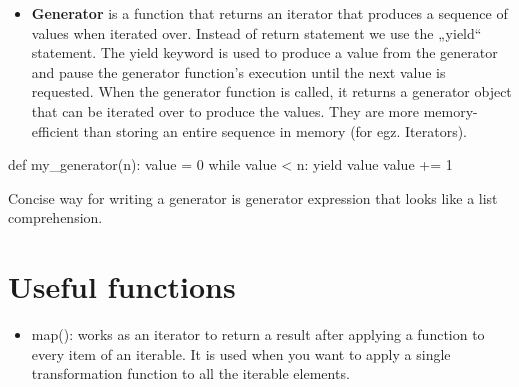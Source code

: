 \documentclass[
  letterpaper,
  DIV=11,
  numbers=noendperiod]{scrreprt}
\newenvironment{Shaded}{\begin{snugshade}}{\end{snugshade}}
\newcommand{\ControlFlowTok}[1]{\textcolor[rgb]{0.00,0.23,0.31}{#1}}
\newcommand{\DecValTok}[1]{\textcolor[rgb]{0.68,0.00,0.00}{#1}}
\newcommand{\KeywordTok}[1]{\textcolor[rgb]{0.00,0.23,0.31}{#1}}
\newcommand{\NormalTok}[1]{\textcolor[rgb]{0.00,0.23,0.31}{#1}}
\newcommand{\OperatorTok}[1]{\textcolor[rgb]{0.37,0.37,0.37}{#1}}
\providecommand{\tightlist}{%
  \setlength{\itemsep}{0pt}\setlength{\parskip}{0pt}}\usepackage{longtable,booktabs,array}
\begin{document}
\begin{itemize}
\tightlist
\item
  \textbf{Generator} is a function that returns an iterator that
  produces a sequence of values when iterated over. Instead of return
  statement we use the „yield`` statement. The yield keyword is used to
  produce a value from the generator and pause the generator function's
  execution until the next value is requested. When the generator
  function is called, it returns a generator object that can be iterated
  over to produce the values. They are more memory-efficient than
  storing an entire sequence in memory (for egz. Iterators).
\end{itemize}

\begin{Shaded}
\begin{Highlighting}[]
\KeywordTok{def}\NormalTok{ my\_generator(n):}
\NormalTok{    value }\OperatorTok{=} \DecValTok{0}
    \ControlFlowTok{while}\NormalTok{ value }\OperatorTok{\textless{}}\NormalTok{ n:}
        \ControlFlowTok{yield}\NormalTok{ value}
\NormalTok{        value }\OperatorTok{+=} \DecValTok{1}
\end{Highlighting}
\end{Shaded}

\begin{tcolorbox}[enhanced jigsaw, opacitybacktitle=0.6, colback=white, bottomrule=.15mm, coltitle=black, opacityback=0, breakable, rightrule=.15mm, colframe=quarto-callout-tip-color-frame, arc=.35mm, titlerule=0mm, colbacktitle=quarto-callout-tip-color!10!white, toptitle=1mm, bottomtitle=1mm, leftrule=.75mm, toprule=.15mm, title=\textcolor{quarto-callout-tip-color}{\faLightbulb}\hspace{0.5em}{Tip}, left=2mm]

Concise way for writing a generator is generator expression that looks
like a list comprehension.

\end{tcolorbox}

\hypertarget{useful-functions}{%
\section{Useful functions}\label{useful-functions}}

\begin{itemize}
\tightlist
\item
  map(): works as an iterator to return a result after applying a
  function to every item of an iterable. It is used when you want to
  apply a single transformation function to all the iterable elements.
\end{itemize}
\end{document}
